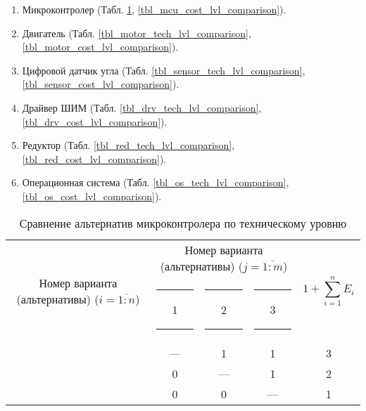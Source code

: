 \begin{enumerate}
    \item Микроконтролер (Табл.
        \ref{tbl_mcu_tech_lvl_comparison},
        \ref{tbl_mcu_cost_lvl_comparison}).

    \item Двигатель (Табл.
        \ref{tbl_motor_tech_lvl_comparison},
        \ref{tbl_motor_cost_lvl_comparison}).

    \item Цифровой датчик угла (Табл.
        \ref{tbl_sensor_tech_lvl_comparison},
        \ref{tbl_sensor_cost_lvl_comparison}).

    \item Драйвер ШИМ (Табл.
        \ref{tbl_drv_tech_lvl_comparison},
        \ref{tbl_drv_cost_lvl_comparison}).

    \item Редуктор (Табл.
        \ref{tbl_red_tech_lvl_comparison},
        \ref{tbl_red_cost_lvl_comparison}).

    \item Операционная система (Табл.
        \ref{tbl_os_tech_lvl_comparison},
        \ref{tbl_os_cost_lvl_comparison}).

\end{enumerate}

\begin{table}[ht!]
    \centering
    \begin{tabular}{|c|c|c|c|c|}
        \hline
        \multirow{2}{2.4cm}[-0.5pc]{
            \centering
            Номер варианта (альтернативы) ($i = \overline{1:n}$)
        } &
        \multicolumn{3}{c|}{
            \parbox[t]{2.4cm}{
                \centering
                Номер варианта (альтернативы) ($j = \overline{1:m}$)
            }
        } &
        \multirow{2}{1.7cm}{
            \centering
            $$1 + \sum_{i=1}^n E_i$$
        } \\
        &
        \centering \rule{2pt}{0pt} 1 \rule{2pt}{0pt} &
        \centering \rule{2pt}{0pt} 2 \rule{2pt}{0pt} &
        \centering \rule{2pt}{0pt} 3 \rule{2pt}{0pt} & \\
        \hline \hline
        \centering{1} &---& 1 & 1 & 3 \\ \hline
        \centering{2} & 0 &---& 1 & 2 \\ \hline
        \centering{3} & 0 & 0 &---& 1 \\ \hline
    \end{tabular}
    \caption{Сравнение альтернатив микроконтролера по техническому уровню}
    \label{tbl_mcu_tech_lvl_comparison}
\end{table}

